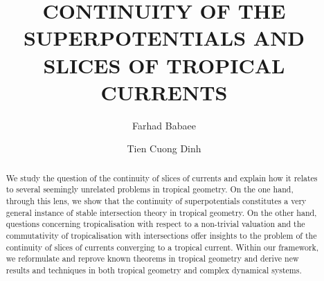 \documentclass[11pt]{amsart}
\theoremstyle{definition}
\begin{document}
\title{CONTINUITY OF THE SUPERPOTENTIALS AND SLICES OF TROPICAL CURRENTS}
\author{Farhad Babaee}
\author{Tien Cuong Dinh}
\address{School of Mathematics, University of Bristol}
\address{Department of Mathematics, National University of Singapore}
\date{}
\begin{abstract}
We study the question of the continuity of slices of currents and explain how it relates to several seemingly unrelated problems in tropical geometry. On the one hand, through this lens, we show that the continuity of superpotentials constitutes a very general instance of stable intersection theory in tropical geometry. On the other hand, questions concerning tropicalisation with respect to a non-trivial valuation and the commutativity of tropicalisation with intersections offer insights to the problem of the continuity of slices of currents converging to a tropical current. Within our framework, we reformulate and reprove known theorems in tropical geometry and derive new results and techniques in both tropical geometry and complex dynamical systems.
\end{abstract}
\maketitle
\setcounter{tocdepth}{1}
\tableofcontents
\end{document}
